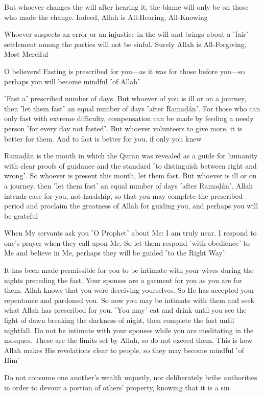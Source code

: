 But whoever changes the will after hearing it, the blame will only be on those who made the change. Indeed, Allah is All-Hearing, All-Knowing

Whoever suspects an error or an injustice in the will and brings about a ˹fair˺ settlement among the parties will not be sinful. Surely Allah is All-Forgiving, Most Merciful

O believers! Fasting is prescribed for you—as it was for those before you—so perhaps you will become mindful ˹of Allah˺

˹Fast a˺ prescribed number of days. But whoever of you is ill or on a journey, then ˹let them fast˺ an equal number of days ˹after Ramaḍân˺. For those who can only fast with extreme difficulty, compensation can be made by feeding a needy person ˹for every day not fasted˺. But whoever volunteers to give more, it is better for them. And to fast is better for you, if only you knew

Ramaḍân is the month in which the Quran was revealed as a guide for humanity with clear proofs of guidance and the standard ˹to distinguish between right and wrong˺. So whoever is present this month, let them fast. But whoever is ill or on a journey, then ˹let them fast˺ an equal number of days ˹after Ramaḍân˺. Allah intends ease for you, not hardship, so that you may complete the prescribed period and proclaim the greatness of Allah for guiding you, and perhaps you will be grateful

When My servants ask you ˹O Prophet˺ about Me: I am truly near. I respond to one’s prayer when they call upon Me. So let them respond ˹with obedience˺ to Me and believe in Me, perhaps they will be guided ˹to the Right Way˺

It has been made permissible for you to be intimate with your wives during the nights preceding the fast. Your spouses are a garment for you as you are for them. Allah knows that you were deceiving yourselves. So He has accepted your repentance and pardoned you. So now you may be intimate with them and seek what Allah has prescribed for you. ˹You may˺ eat and drink until you see the light of dawn breaking the darkness of night, then complete the fast until nightfall. Do not be intimate with your spouses while you are meditating in the mosques. These are the limits set by Allah, so do not exceed them. This is how Allah makes His revelations clear to people, so they may become mindful ˹of Him˺

Do not consume one another’s wealth unjustly, nor deliberately bribe authorities in order to devour a portion of others’ property, knowing that it is a sin

